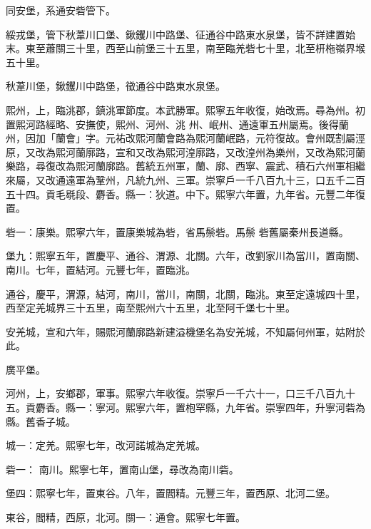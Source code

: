\begin{pinyinscope}
 同安堡，系通安砦管下。



 綏戎堡，管下秋葦川口堡、鍬钁川中路堡、征通谷中路東水泉堡，皆不詳建置始末。東至蕭關三十里，西至山前堡三十五里，南至臨羌砦七十里，北至枅柂嶺界堠五十里。



 秋葦川堡，鍬钁川中路堡，徵通谷中路東水泉堡。



 熙州，上，臨洮郡，鎮洮軍節度。本武勝軍。熙寧五年收復，始改焉。尋為州。初置熙河路經略、安撫使，熙州、河州、洮
 州、岷州、通遠軍五州屬焉。後得蘭州，因加「蘭會」字。元祐改熙河蘭會路為熙河蘭岷路，元符復故。會州既割屬涇原，又改為熙河蘭廓路，宣和又改為熙河湟廓路，又改湟州為樂州，又改為熙河蘭樂路，尋復改為熙河蘭廓路。舊統五州軍，蘭、廓、西寧、震武、積石六州軍相繼來屬，又改通遠軍為鞏州，凡統九州、三軍。崇寧戶一千八百九十三，口五千二百五十四。貢毛毼段、麝香。縣一：狄道。中下。熙寧六年置，九年省。元豐二年復置。



 砦一：康樂。熙寧六年，置康樂城為砦，省馬鬃砦。馬鬃
 砦舊屬秦州長道縣。



 堡九：熙寧五年，置慶平、通谷、渭源、北關。六年，改劉家川為當川，置南關、南川。七年，置結河。元豐七年，置臨洮。



 通谷，慶平，渭源，結河，南川，當川，南關，北關，臨洮。東至定遠城四十里，西至定羌城界三十五里，南至熙州六十五里，北至阿千堡七十里。



 安羌城，宣和六年，賜熙河蘭廓路新建溢機堡名為安羌城，不知屬何州軍，姑附於此。



 廣平堡。



 河州，上，安鄉郡，軍事。熙寧六年收復。崇寧戶一千六十一，口三千八百九十五。貢麝香。縣一：寧河。熙寧六年，置枹罕縣，九年省。崇寧四年，升寧河砦為縣。舊香子城。



 城一：定羌。熙寧七年，改河諾城為定羌城。



 砦一：
 南川。熙寧七年，置南山堡，尋改為南川砦。



 堡四：熙寧七年，置東谷。八年，置閻精。元豐三年，置西原、北河二堡。



 東谷，閻精，西原，北河。關一：通會。熙寧七年置。




\end{pinyinscope}
